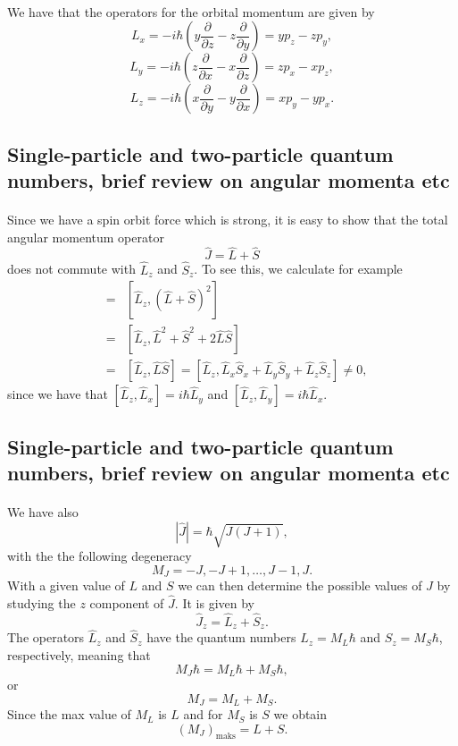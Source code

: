 \documentclass[%
twoside,                 %
final,                   %
10pt]{article}
\begin{document}
\paragraph{}
We have that the operators for the orbital momentum are given by
\[
L_x=-i\hbar(y\frac{\partial }{\partial z}-z\frac{\partial }{\partial y})=
yp_z-zp_y,
\]
\[
L_y=-i\hbar(z\frac{\partial }{\partial x}-x\frac{\partial }{\partial z})= zp_x-xp_z,
\]
\[
L_z=-i\hbar(x\frac{\partial }{\partial y}-y\frac{\partial }{\partial x})=xp_y-yp_x.
\]



\subsection*{Single-particle and two-particle quantum numbers, brief review on angular momenta etc}

\paragraph{}
Since we have a spin orbit force which is strong, it is easy to show that 
the total angular momentum operator
\[
   \hat{J}=\hat{L}+\hat{S}
\]
does not commute with $\hat{L}_z$ and $\hat{S}_z$. To see this, we calculate for example
\begin{eqnarray} 
   [\hat{L}_z,\hat{J}^2]&=&[\hat{L}_z,(\hat{L}+\hat{S})^2] \\ \nonumber
   &=&[\hat{L}_z,\hat{L}^2+\hat{S}^2+2\hat{L}\hat{S}]\\ \nonumber 
   &=& [\hat{L}_z,\hat{L}\hat{S}]=[\hat{L}_z,\hat{L}_x\hat{S}_x+\hat{L}_y\hat{S}_y+\hat{L}_z\hat{S}_z]\ne 0, 
\end{eqnarray}
since we have that $[\hat{L}_z,\hat{L}_x]=i\hbar\hat{L}_y$ and $[\hat{L}_z,\hat{L}_y]=i\hbar\hat{L}_x$.



\subsection*{Single-particle and two-particle quantum numbers, brief review on angular momenta etc}

\paragraph{}
We have also
\[
   |\hat{J}|=\hbar\sqrt{J(J+1)},
\]
with the the following degeneracy
\[
   M_J=-J, -J+1, \dots, J-1, J.
\]
With a given value of  $L$ and $S$ we can then determine the possible values of 
 $J$ by studying the $z$ component of  $\hat{J}$. 
It is given by
\[
\hat{J}_z=\hat{L}_z+\hat{S}_z.
\]
The operators $\hat{L}_z$ and $\hat{S}_z$ have the quantum numbers
$L_z=M_L\hbar$ and $S_z=M_S\hbar$, respectively, meaning that
\[
   M_J\hbar=M_L\hbar +M_S\hbar,
\]
or
\[
   M_J=M_L +M_S.
\]
Since the max value of  $M_L$ is $L$ and for  $M_S$ is $S$
we obtain
\[
   (M_J)_{\mathrm{maks}}=L+S.
\]
\end{document}
